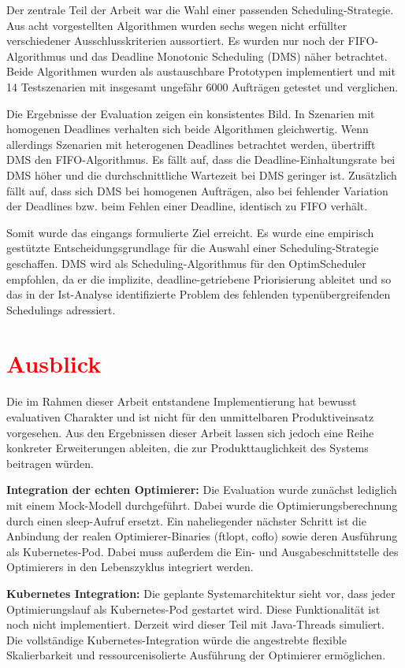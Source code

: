 \documentclass[
    12pt,               
    a4paper,            
    ngerman,            
    parskip=half,       
    headings=normal,   
    numbers=enddot,     
    toc=chapterentrywithdots 
]{scrreprt}\usepackage[utf8]{inputenc}
\begin{document}
Der zentrale Teil der Arbeit war die Wahl einer passenden Scheduling-Strategie. Aus acht vorgestellten Algorithmen wurden sechs wegen nicht erfüllter verschiedener Ausschlusskriterien aussortiert. Es wurden nur noch der FIFO-Algorithmus und das Deadline Monotonic Scheduling (DMS) näher betrachtet. Beide Algorithmen wurden als austauschbare Prototypen implementiert und mit 14 Testszenarien mit insgesamt ungefähr 6000 Aufträgen getestet und verglichen.

Die Ergebnisse der Evaluation zeigen ein konsistentes Bild. In Szenarien mit homogenen Deadlines verhalten sich beide Algorithmen gleichwertig. Wenn allerdings Szenarien mit heterogenen Deadlines betrachtet werden, übertrifft DMS den FIFO-Algorithmus. Es fällt auf, dass die Deadline-Einhaltungsrate bei DMS höher und die durchschnittliche Wartezeit bei DMS geringer ist. Zusätzlich fällt auf, dass sich DMS bei homogenen Aufträgen, also bei fehlender Variation der Deadlines bzw. beim Fehlen einer Deadline, identisch zu FIFO verhält.

Somit wurde das eingangs formulierte Ziel erreicht. Es wurde eine empirisch gestützte Entscheidungsgrundlage für die Auswahl einer Scheduling-Strategie geschaffen. DMS wird als Scheduling-Algorithmus für den OptimScheduler empfohlen, da er die implizite, deadline-getriebene Priorisierung ableitet und so das in der Ist-Analyse identifizierte Problem des fehlenden typenübergreifenden Schedulings adressiert.

\section{\textcolor{red}{Ausblick}}
Die im Rahmen dieser Arbeit entstandene Implementierung hat bewusst evaluativen Charakter und ist nicht für den unmittelbaren Produktiveinsatz vorgesehen. Aus den Ergebnissen dieser Arbeit lassen sich jedoch eine Reihe konkreter Erweiterungen ableiten, die zur Produkttauglichkeit des Systems beitragen würden.

\textbf{Integration der echten Optimierer:} Die Evaluation wurde zunächst lediglich mit einem Mock-Modell durchgeführt. Dabei wurde die Optimierungsberechnung durch einen sleep-Aufruf ersetzt. Ein naheliegender nächster Schritt ist die Anbindung der realen Optimierer-Binaries (ftlopt, coflo) sowie deren Ausführung als Kubernetes-Pod. Dabei muss außerdem die Ein- und Ausgabeschnittstelle des Optimierers in den Lebenszyklus integriert werden.

\textbf{Kubernetes Integration:} Die geplante Systemarchitektur sieht vor, dass jeder Optimierungslauf als Kubernetes-Pod gestartet wird. Diese Funktionalität ist noch nicht implementiert. Derzeit wird dieser Teil mit Java-Threads simuliert.  Die vollständige Kubernetes-Integration würde die angestrebte flexible Skalierbarkeit und ressourcenisolierte Ausführung der Optimierer ermöglichen.
\end{document}

